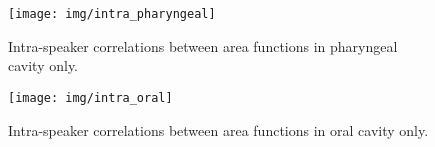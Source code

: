 \begin{figure}[H]
    \centering
    \texttt{[image: img/intra\_pharyngeal]}
    \caption{Intra-speaker correlations between area functions in pharyngeal cavity only.}
    \label{fig:intra_pharyngeal}
\end{figure}

\begin{figure}[H]
    \centering
    \texttt{[image: img/intra\_oral]}
    \caption{Intra-speaker correlations between area functions in oral cavity only.}
    \label{fig:intra_oral}
\end{figure}